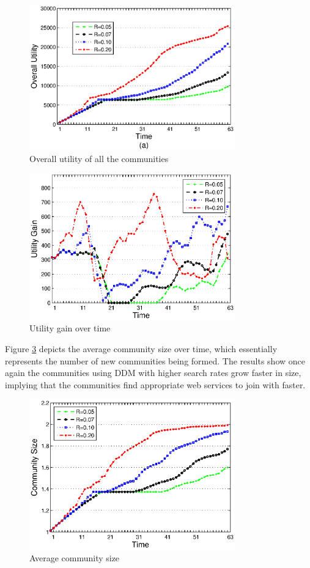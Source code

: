 \documentclass[11pt,onecolumn]{IEEEtran}
\begin{document}
{\begin{figure}%
\centering
\includegraphics[width=3.5in]{figures/stats1.eps}
\caption{Overall utility of all the communities}
\label{stats1}
\end{figure}


\begin{figure}%
\centering
\includegraphics[width=3.5in]{figures/stats2.eps}
\caption{Utility gain over time}
\label{stats2}
\end{figure}

Figure \ref{stats3} depicts the average community size over time, which essentially represents the number of new communities being formed. The results show once again the communities using DDM with higher search rates grow faster in size, implying that the communities find appropriate web services to join with faster.

\begin{figure}%
\centering
\includegraphics[width=3.5in]{figures/stats3.eps}
\caption{Average community size}
\label{stats3}
\end{figure}

}
\end{document}

